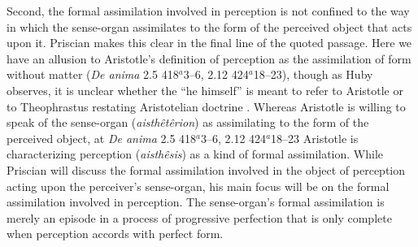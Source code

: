 \documentclass[12pt]{article}
\begin{document}
Second, the formal assimilation involved in perception is not confined to the way in which the sense-organ assimilates to the form of the perceived object that acts upon it. Priscian makes this clear in the final line of the quoted passage. Here we have an allusion to Aristotle's definition of perception as the assimilation of form without matter (\emph{De anima} 2.5 418\( ^{a} \)3--6, 2.12 424\( ^{a} \)18--23), though as Huby observes, it is unclear whether the ``he himself'' is meant to refer to Aristotle or to Theophrastus restating Aristotelian doctrine \citep[49--50 n11]{Sorabji:1997ly}. Whereas Aristotle is willing to speak of the sense-organ (\emph{aisthêtêrion}) as assimilating to the form of the perceived object, at \emph{De anima} 2.5 418\( ^{a} \)3--6, 2.12 424\( ^{a} \)18--23 Aristotle is characterizing perception (\emph{aisthêsis}) as a kind of formal assimilation. While Priscian will discuss the formal assimilation involved in the object of perception acting upon the perceiver's sense-organ, his main focus will be on the formal assimilation involved in perception. The sense-organ's formal assimilation is merely an episode in a process of progressive perfection that is only complete when perception accords with perfect form.
\end{document}
